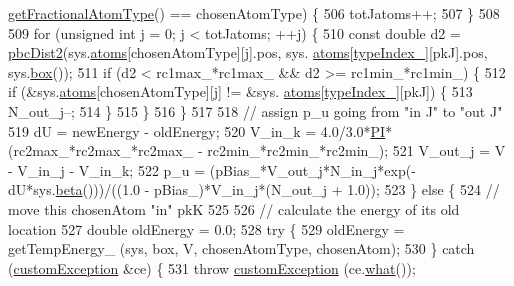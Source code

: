 \begin{DoxyCode}
      \hyperlink{classsim_system_a0500a9e84eecfbde7a98cf8a34f719d5}{getFractionalAtomType}() == chosenAtomType) \{
506                             totJatoms++;
507                     \}
508 
509                     \textcolor{keywordflow}{for} (\textcolor{keywordtype}{unsigned} \textcolor{keywordtype}{int} j = 0; j < totJatoms; ++j) \{
510                             \textcolor{keyword}{const} \textcolor{keywordtype}{double} d2 = \hyperlink{utilities_8cpp_abb1db3a8a3ac46e044bbe7b2c5684c0a}{pbcDist2}(sys.\hyperlink{classsim_system_a90421b19082f7fb8fc23b7264b1161e4}{atoms}[chosenAtomType][j].pos, sys.
      \hyperlink{classsim_system_a90421b19082f7fb8fc23b7264b1161e4}{atoms}[\hyperlink{classmc_move_acb731965547b0326ef318ec96da8b46a}{typeIndex\_}][pkJ].pos, sys.\hyperlink{classsim_system_a8bff9dfb95b1b09a0fab2c1c485ade07}{box}());
511                 \textcolor{keywordflow}{if} (d2 < rc1max\_*rc1max\_ && d2 >= rc1min\_*rc1min\_) \{
512                                     \textcolor{keywordflow}{if} (&sys.\hyperlink{classsim_system_a90421b19082f7fb8fc23b7264b1161e4}{atoms}[chosenAtomType][j] != &sys.
      \hyperlink{classsim_system_a90421b19082f7fb8fc23b7264b1161e4}{atoms}[\hyperlink{classmc_move_acb731965547b0326ef318ec96da8b46a}{typeIndex\_}][pkJ]) \{
513                         N\_out\_j--;
514                     \}
515                             \}
516                     \}
517 
518                     \textcolor{comment}{// assign p\_u going from "in J" to "out J"}
519                 dU = newEnergy - oldEnergy;
520             V\_in\_k = 4.0/3.0*\hyperlink{global_8h_a598a3330b3c21701223ee0ca14316eca}{PI}*(rc2max\_*rc2max\_*rc2max\_ - rc2min\_*rc2min\_*rc2min\_);
521             V\_out\_j = V - V\_in\_j - V\_in\_k;
522             p\_u = (pBias\_*V\_out\_j*N\_in\_j*exp(-dU*sys.\hyperlink{classsim_system_a3eeec9678902f8d7fce4dad6064aaf4c}{beta}()))/((1.0 - pBias\_)*V\_in\_j*(N\_out\_j + 1.0));
523         \} \textcolor{keywordflow}{else} \{
524                     \textcolor{comment}{// move this chosenAtom "in" pkK}
525 
526                     \textcolor{comment}{// calculate the energy of its old location}
527                     \textcolor{keywordtype}{double} oldEnergy = 0.0;
528                     \textcolor{keywordflow}{try} \{
529                         oldEnergy = getTempEnergy\_ (sys, box, V, chosenAtomType, chosenAtom);
530                     \} \textcolor{keywordflow}{catch} (\hyperlink{classcustom_exception}{customException} &ce) \{
531                         \textcolor{keywordflow}{throw} \hyperlink{classcustom_exception}{customException} (ce.\hyperlink{classcustom_exception_aeb6ab5848b038adfc68fde86a512f691}{what}());

\end{DoxyCode}
